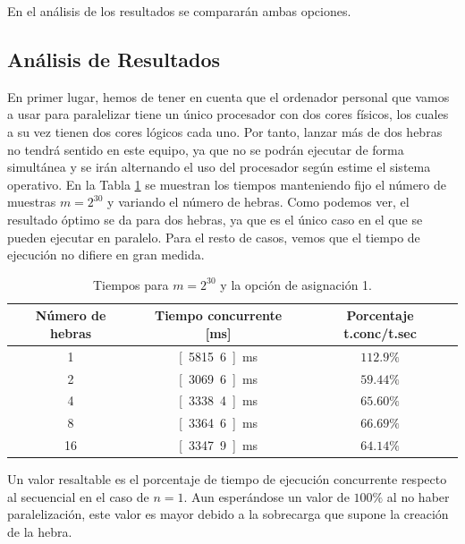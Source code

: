 \documentclass[12pt]{book}
\begin{document}
    En el análisis de los resultados se compararán ambas opciones.

    \subsection{Análisis de Resultados}

    En primer lugar, hemos de tener en cuenta que el ordenador personal que vamos
    a usar para paralelizar tiene un único procesador con dos cores físicos, los cuales a su vez tienen
    dos cores lógicos cada uno. Por tanto, lanzar más de dos hebras no tendrá sentido en este equipo,
    ya que no se podrán ejecutar de forma simultánea y se irán alternando el uso del procesador
    según estime el sistema operativo. En la Tabla \ref{tab:dist_num_hebras} se muestran los tiempos
    manteniendo fijo el número de muestras $m=2^{30}$ y variando el número de hebras.
    Como podemos ver, el resultado óptimo se da para dos hebras, ya que es el único caso en el que se pueden ejecutar en paralelo.
    Para el resto de casos, vemos que el tiempo de ejecución no difiere en gran medida.
    \begin{table}
        \centering
        \begin{tabular}{|c|c|c|}
            \hline
            \textbf{Número de hebras} & \textbf{Tiempo concurrente [ms]} & \textbf{Porcentaje t.conc/t.sec} \\
            \hline
            1 & \unit[5815.6]{ms} & $112.9\%$ \\
            2 & \unit[3069.6]{ms} & $59.44\%$ \\
            4 & \unit[3338.4]{ms} & $65.60\%$ \\
            8 & \unit[3364.6]{ms} & $66.69\%$ \\
            16 & \unit[3347.9]{ms} & $64.14\%$ \\
            \hline
        \end{tabular}
        \caption{Tiempos para $m=2^{30}$ y la opción de asignación 1.}
        \label{tab:dist_num_hebras}
    \end{table}
    Un valor resaltable es el porcentaje de tiempo de ejecución concurrente respecto al secuencial en el caso de $n=1$.
    Aun esperándose un valor de $100\%$ al no haber paralelización, este valor es mayor debido a la sobrecarga que supone la creación de la hebra.
\end{document}
